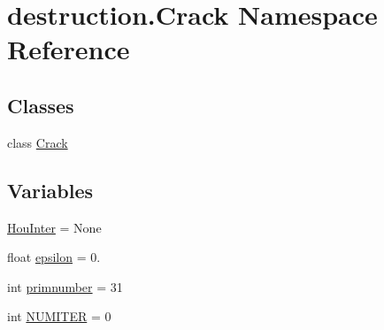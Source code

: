 \hypertarget{namespacedestruction_1_1_crack}{\section{destruction.\-Crack Namespace Reference}
\label{namespacedestruction_1_1_crack}
}
\subsection*{Classes}
\begin{DoxyCompactItemize}
\item 
class \hyperlink{classdestruction_1_1_crack_1_1_crack}{Crack}
\end{DoxyCompactItemize}
\subsection*{Variables}
\begin{DoxyCompactItemize}
\item 
\hyperlink{namespacedestruction_1_1_crack_a7675ce64482b592c483235026d4e8aab}{Hou\-Inter} = None
\item 
float \hyperlink{namespacedestruction_1_1_crack_a63e5a34ac4807827ab56a6450ff01cdb}{epsilon} = 0.
\item 
int \hyperlink{namespacedestruction_1_1_crack_a2e624ca657ffa64d3c5b4e3b8e52ef6f}{primnumber} = 31
\item 
int \hyperlink{namespacedestruction_1_1_crack_a73d6754c9ad2a270b1bc696209c98dc5}{N\-U\-M\-I\-T\-E\-R} = 0
\end{DoxyCompactItemize}



